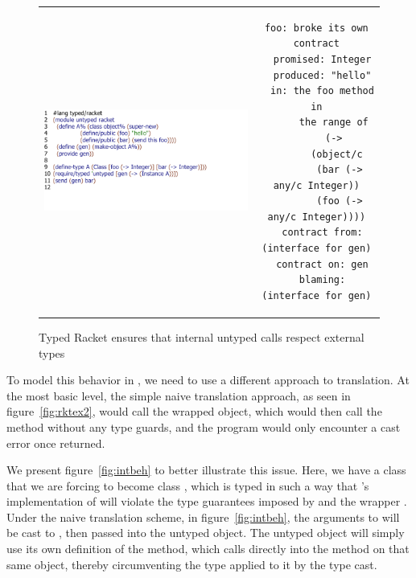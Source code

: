 \documentclass[a4paper,USenglish]{tex/lipics-v2016}
\begin{document}
\begin{figure}
\begin{tabular}{cc}
\includegraphics[scale=.7]{figures/internal.pdf}&\hspace{-2cm}
\begin{minipage}{.5\textwidth}
\vspace{-4.3cm}
\tiny
\begin{lstlisting}[basicstyle=\scriptsize\ttfamily]
foo: broke its own contract
  promised: Integer
  produced: "hello"
  in: the foo method in
      the range of
      (->
       (object/c
        (bar (-> any/c Integer))
        (foo (-> any/c Integer))))
  contract from: (interface for gen)
  contract on: gen
  blaming: (interface for gen)
\end{lstlisting}
\end{minipage}
\end{tabular}
\caption{Typed Racket ensures that internal untyped calls respect external types}
\label{fig:arktex3}
\end{figure}

To model this behavior in \kafka, we need to use a different approach to translation. 
At the most basic level, the simple naive translation approach, as seen in
figure~\ref{fig:rktex2}, would call the wrapped object, which would then call 
the  method without any type guards, and the program would 
only encounter a cast error once  returned.

We present figure~\ref{fig:intbeh} to better illustrate this issue. Here, we have a class \C
that we are forcing to become class \D, which is typed in such a way that \C's
implementation of \n will violate the type guarantees imposed by \D and the wrapper . 
Under the naive translation scheme, in figure~\ref{fig:intbeh}, the arguments to \m will be cast to \any, 
then passed into the untyped object. The untyped object \C will simply use its own definition
of the \m method, which calls directly into the \n method on that same object,
thereby circumventing the type applied to it by the type cast.
\end{document}

